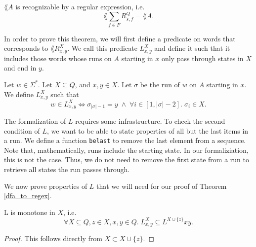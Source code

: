 \begin{theorem}
    \label{dfa_to_regex} $\lang{A}$ is recognizable by a regular expression, i.e.
    \begin{equation*}
        \lang{\sum\limits_{f \in F} R^Q_{s,f}} = \lang{A}.
    \end{equation*}
\end{theorem}

In order to prove this theorem, we will first define a predicate on words that corresponds to $\lang{R^X_{x,y}}$.
We call this predicate $L^X_{x,y}$ and define it such that it includes those words 
whose runs on $A$ starting in $x$ only pass through states in $X$ and end in $y$.

\begin{definition}
    Let $w \in \Sigma^*$.
    Let $X \subseteq Q$, and $x,y \in X$.
    Let $\sigma$ be the run of $w$ on $A$ starting in $x$.
    We define $L^X_{x,y}$ such that
    \begin{equation*}
        w \in L^X_{x,y} \iff \sigma_{|\sigma|-1} = y \; \wedge \; \forall i \in [1,|\sigma|-2]. \; \sigma_i \in X.
    \end{equation*}
\end{definition}

The formalization of $L$ requires some infrastructure. 
To check the second condition of $L$, we want to be able to state properties of all but the last items in a run.
We define a function \lstinline{belast} to remove the last element from a sequence. 
Note that, mathematically, runs include the starting state.
In our formaliziation, this is not the case.
Thus, we do not need to remove the first state from a run to retrieve all states the run passes through.


We now prove properties of $L$ that we will need for our proof of Theorem \ref{dfa_to_regex}.

\begin{lemma}
    \label{L_monotone}
    L is monotone in $X$, i.e.
    \begin{equation*}
        \forall X \subseteq Q, z \in X, x,y \in Q. \; L^X_{x,y} \subseteq L^{X\cup\{z\}} x y.
    \end{equation*}
\end{lemma}
\begin{proof}
    This follows directly from $X \subset X\cup\{z\}$.
\end{proof}

